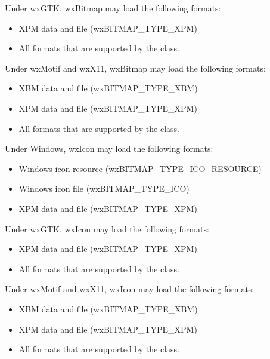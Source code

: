 Under wxGTK, wxBitmap may load the following formats:

\begin{itemize}\itemsep=0pt
\item XPM data and file (wxBITMAP\_TYPE\_XPM)
\item All formats that are supported by the  class.
\end{itemize}

Under wxMotif and wxX11, wxBitmap may load the following formats:

\begin{itemize}\itemsep=0pt
\item XBM data and file (wxBITMAP\_TYPE\_XBM)
\item XPM data and file (wxBITMAP\_TYPE\_XPM)
\item All formats that are supported by the  class.
\end{itemize}


Under Windows, wxIcon may load the following formats:

\begin{itemize}\itemsep=0pt
\item Windows icon resource (wxBITMAP\_TYPE\_ICO\_RESOURCE)
\item Windows icon file (wxBITMAP\_TYPE\_ICO)
\item XPM data and file (wxBITMAP\_TYPE\_XPM)
\end{itemize}

Under wxGTK, wxIcon may load the following formats:

\begin{itemize}\itemsep=0pt
\item XPM data and file (wxBITMAP\_TYPE\_XPM)
\item All formats that are supported by the  class.
\end{itemize}

Under wxMotif and wxX11, wxIcon may load the following formats:

\begin{itemize}\itemsep=0pt
\item XBM data and file (wxBITMAP\_TYPE\_XBM)
\item XPM data and file (wxBITMAP\_TYPE\_XPM)
\item All formats that are supported by the  class.
\end{itemize}

